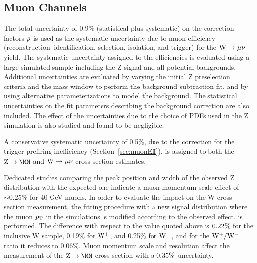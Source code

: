 \subsection{Muon Channels}
\label{sec:muonSyst}


The total uncertainty of 0.9\%  (statistical plus systematic) on the 
correction factors $\rho$ is used as the systematic uncertainty due to muon efficiency 
(reconstruction, identification, selection, isolation,
and trigger) for the $\mathrm{W} \rightarrow \mu\nu$ yield. 
%
%
The systematic uncertainty assigned to the efficiencies is evaluated using
a large simulated sample including the Z signal and all potential backgrounds. 
Additional uncertainties are evaluated by varying the initial Z preselection criteria and
the mass window to perform the background subtraction fit, and by using alternative parameterizations to model the 
background. The statistical uncertainties on the fit parameters describing the background correction 
are also included. The effect of the uncertainties due to the choice of PDFs used in the Z simulation is also studied and found to 
be negligible.


A conservative systematic uncertainty of 0.5\%, due to the correction for the trigger prefiring inefficiency 
(Section~\ref{sec:muonEff}), is assigned to both the $\Zmm$ and $\mathrm{W} \rightarrow \mu\nu$ cross-section estimates.

Dedicated studies comparing the peak position and width of the observed Z distribution
with the expected one indicate a muon momentum scale effect of ${\sim} 0.25\%$ for 40 GeV muons.
In order to evaluate the impact on the W cross-section measurement,
the fitting procedure with a new signal distribution where the muon $p_{\mathrm{T}}$ in the simulations
is modified according to the observed effect, is performed. The difference with respect to the value
quoted above is $ 0.22 $\% for the inclusive W sample, 0.19\% for $\mathrm{W^+}$, and 0.25\% for $\mathrm{W^-}$,
and for the $\mathrm{W^+}/\mathrm{W^-}$ ratio it reduces to 0.06\%.
Muon momentum scale and resolution affect the measurement of the $\Zmm$ cross section 
with a $ 0.35 \%$ uncertainty.

